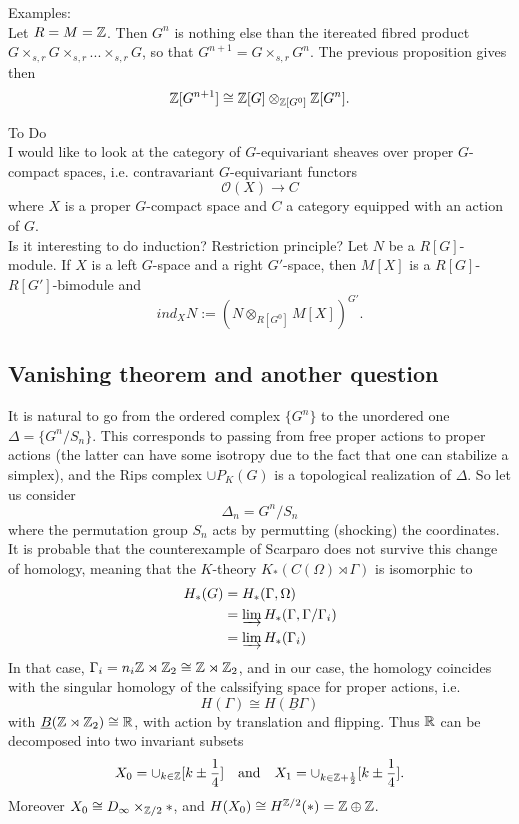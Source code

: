 Examples: \\
Let $R=M= \mathbb Z$. Then $G^n$ is nothing else than the itereated fibred product $G\times_{s,r} G \times_{s,r} ... \times_{s,r} G$, so that $G^{n+1} = G\times_{s,r} G^n $. The previous proposition gives then
\[\mathbb Z[G^{n+1}]\cong \mathbb Z [G] \otimes_{\mathbb Z [G^0] } \mathbb Z[G^n]. \]

To Do\\
I would like to look at the category of $G$-equivariant sheaves over proper $G$-compact spaces, i.e. contravariant $G$-equivariant functors 
\[\mathcal O (X) \rightarrow C\]
where $X$ is a proper $G$-compact space and $C$ a category equipped with an action of $G$.\\

Is it interesting to do induction? Restriction principle? Let $N$ be a $R[G]$-module. If $X$ is a left $G$-space and a right $G'$-space, then $M[X]$ is a $R[G]$-$R[G']$-bimodule and 
\[ ind_X N := (N \otimes_{R[G^0]} M[X])^{G'}. \]

\subsection{Vanishing theorem and another question}

It is natural to go from the ordered complex $\{G^n\}$ to the unordered one $\Delta=\{G^n/S_n\}$. This corresponds to passing from free proper actions to proper actions (the latter can have some isotropy due to the fact that one can stabilize a simplex), and the Rips complex $\cup P_K(G)$ is a topological realization of $\Delta$. So let us consider
\[\Delta_n = G^n / S_n\] where the permutation group $S_n$ acts by permutting (shocking) the coordinates. \\

It is probable that the counterexample of Scarparo does not survive this change of homology, meaning that the $K$-theory $K_*(C(\Omega)\rtimes \Gamma)$ is isomorphic to 
\[\begin{split}
H_*(G)  & =  H_*(\Gamma, \Omega)\\
	&= \varinjlim H_*(\Gamma, \Gamma / \Gamma_i) \\
	& = \varinjlim H_*( \Gamma_i) 
\end{split}\]
In that case, $\Gamma_i = n_i\mathbb Z \rtimes \mathbb Z_2 \cong \mathbb Z \rtimes \mathbb Z_2$, and in our case, the homology coincides with the singular homology of the calssifying space for proper actions, i.e.
\[ H(\Gamma) \cong H(\underline B \Gamma)\]
with $\underline B ( \mathbb Z \rtimes \mathbb Z_2 )\cong \mathbb R$, with action by translation and flipping. Thus $\mathbb R$ can be decomposed into two invariant subsets
\[X_0 = \cup_{k\in \mathbb Z} [k \pm \frac{1}{4}] \quad \text{and} \quad X_1 = \cup_{k\in \mathbb Z+\frac{1}{2}} [k \pm \frac{1}{4}].\]
Moreover $X_0 \cong D_\infty \times_{\mathbb Z /2 } \ast $, and $H(X_0) \cong H^{\mathbb Z/2}(\ast) = \mathbb Z \oplus \mathbb Z$.\\

